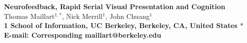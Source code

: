 \documentclass[12pt]{article}
\date{}
\begin{document}
\begin{flushleft}
{\Large
\textbf{Neurofeedback, Rapid Serial Visual Presentation and Cognition}
}
\\
Thomas Maillart$^{1,\ast}$, 
Nick Merrill$^{1}$, 
John Chuang$^{1}$
\\
\bf{1} School of Information, UC Berkeley, Berkeley, CA, United States
$\ast$ E-mail: Corresponding maillart@berkeley.edu
\end{flushleft}










%
%
%
%


\end{document}
